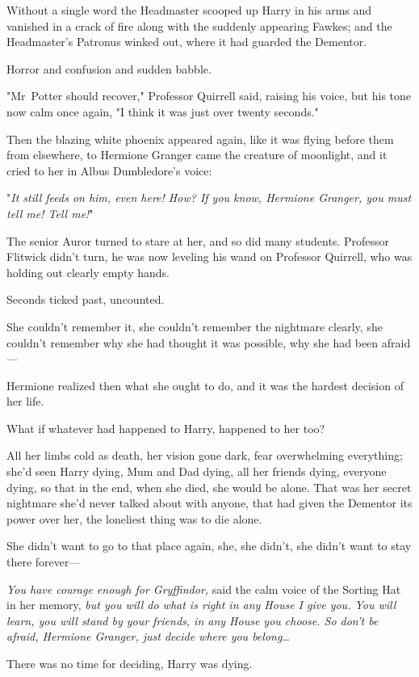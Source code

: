 Without a single word the Headmaster scooped up Harry in his arms and vanished
in a crack of fire along with the suddenly appearing Fawkes; and the
Headmaster's Patronus winked out, where it had guarded the Dementor.

Horror and confusion and sudden babble.

"Mr~Potter should recover," Professor Quirrell said, raising his voice, but
his tone now calm once again, "I think it was just over twenty seconds."

Then the blazing white phoenix appeared again, like it was flying before them
from elsewhere, to Hermione Granger came the creature of moonlight, and it
cried to her in Albus Dumbledore's voice:

"\emph{It still feeds on him, even here! How? If you know, Hermione Granger,
you must tell me! Tell me!}"

The senior Auror turned to stare at her, and so did many students. Professor
Flitwick didn't turn, he was now leveling his wand on Professor Quirrell, who
was holding out clearly empty hands.

Seconds ticked past, uncounted.

She couldn't remember it, she couldn't remember the nightmare clearly, she
couldn't remember why she had thought it was possible, why she had been
afraid—

Hermione realized then what she ought to do, and it was the hardest decision of
her life.

What if whatever had happened to Harry, happened to her too?

All her limbs cold as death, her vision gone dark, fear overwhelming
everything; she'd seen Harry dying, Mum and Dad dying, all her friends dying,
everyone dying, so that in the end, when she died, she would be alone. That was
her secret nightmare she'd never talked about with anyone, that had given the
Dementor its power over her, the loneliest thing was to die alone.

She didn't want to go to that place again, she, she didn't, she didn't want to
stay there forever—

\emph{You have courage enough for Gryffindor,} said the calm voice of the
Sorting Hat in her memory, \emph{but you will do what is right in any House I
give you. You will learn, you will stand by your friends, in any House you
choose. So don't be afraid, Hermione Granger, just decide where you
belong…}

There was no time for deciding, Harry was dying.

